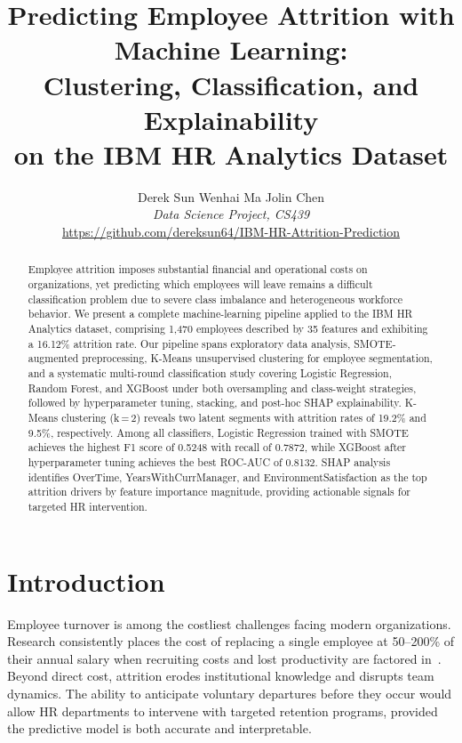 \documentclass{article}
\title{Predicting Employee Attrition with Machine Learning:\\
Clustering, Classification, and Explainability\\
on the IBM HR Analytics Dataset}
\author{%
  \centering
  Derek Sun \quad
  Wenhai Ma \quad
  Jolin Chen \\[0.4em]
  \textit{Data Science Project, CS439} \\[0.3em]
  \small\url{https://github.com/dereksun64/IBM-HR-Attrition-Prediction}
}
\begin{document}
\maketitle

\begin{abstract}
Employee attrition imposes substantial financial and operational costs on
organizations, yet predicting which employees will leave remains a difficult
classification problem due to severe class imbalance and heterogeneous
workforce behavior. We present a complete machine-learning pipeline applied
to the IBM HR Analytics dataset, comprising 1,470 employees described by
35 features and exhibiting a 16.12\% attrition rate. Our pipeline spans
exploratory data analysis, SMOTE-augmented preprocessing, K-Means
unsupervised clustering for employee segmentation, and a systematic
multi-round classification study covering Logistic Regression, Random
Forest, and XGBoost under both oversampling and class-weight strategies,
followed by hyperparameter tuning, stacking, and post-hoc SHAP
explainability. K-Means clustering (k\,=\,2) reveals two latent segments
with attrition rates of 19.2\% and 9.5\%, respectively. Among all
classifiers, Logistic Regression trained with SMOTE achieves the highest
F1 score of 0.5248 with recall of 0.7872, while XGBoost after
hyperparameter tuning achieves the best ROC-AUC of 0.8132. SHAP analysis identifies OverTime, YearsWithCurrManager, and
EnvironmentSatisfaction as the top attrition drivers by feature
importance magnitude, providing actionable signals for targeted
HR intervention.
\end{abstract}

\section{Introduction}

Employee turnover is among the costliest challenges facing modern
organizations. Research consistently places the cost of replacing a single
employee at 50--200\% of their annual salary when recruiting costs
and lost productivity are factored in~\citep{fallucchi2020predicting,
alduayj2018predicting}. Beyond direct cost, attrition erodes institutional
knowledge and disrupts team dynamics. The ability to anticipate voluntary
departures before they occur would allow HR departments to intervene with
targeted retention programs, provided the predictive model is both accurate and interpretable.
\end{document}
